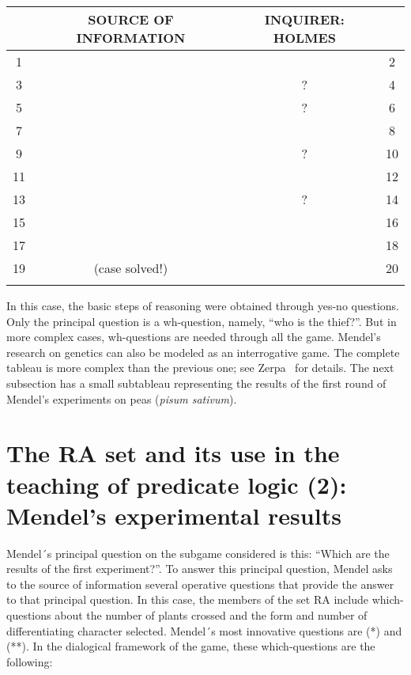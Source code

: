 \documentclass[a4paper,UKenglish]{lipics}
\begin{document}
\begin{table*}[htbp]
\begin{tabular}{cccc}
 
 \\
 &SOURCE OF INFORMATION&INQUIRER: HOLMES&\\ \hline
 1 &  &  & 2 \\ \hline
 3 &  & ? & 4\\ \hline
 5 &  & ? & 6\\ \hline
 7 &  &  & 8\\ \hline
 9 &  & ? & 10\\ \hline
 11 &  & & 12 \\ \hline
 13 &  & ? & 14 \\ \hline
 15 &  & & 16 \\ \hline 
 17 &  &  & 18 \\ \hline
 19 &  (case solved!) &  & 20 \\ \hline
 \\
 \end{tabular}
\end{table*}

In this case, the basic steps of reasoning were obtained through yes-no questions. Only the principal question is a wh-question, namely, “who is the thief?”. But in more complex cases, wh-questions are needed through all the game. Mendel’s research on genetics can also be modeled as an interrogative game. The complete tableau is more complex than the previous one; see Zerpa~\cite{Zerpa} for details. The next subsection has a small subtableau representing the results of the first round of Mendel’s experiments on peas (\textit{pisum sativum}). 

\section{The RA set and its use in the teaching of predicate logic (2): Mendel’s experimental results}

Mendel´s principal question on the subgame considered is this: “Which are the results of the first experiment?”. To answer this principal question, Mendel asks to the source of information several operative questions that provide the answer to that principal question. In this case, the members of the set RA include which-questions about the number of plants crossed and the form and number of differentiating character selected. Mendel´s most innovative questions are (*) and (**). In the dialogical framework of the game, these which-questions are the following:
\end{document}
